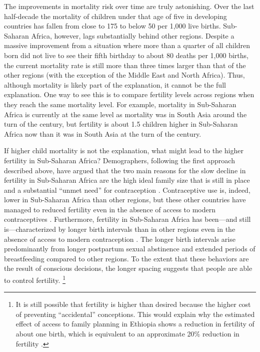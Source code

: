\documentclass[letterpaper,12pt]{article}
\begin{document}
The improvements in mortality risk over time are truly astonishing. 
Over the last half-decade the mortality of children under that age of
five in developing countries has fallen from close to 175 to below 50
per 1,000 live births. 
Sub-Saharan Africa, however, lags substantially behind other regions. 
Despite a massive improvement from a situation where more than a quarter
of all children born did not live to see their fifth birthday to about
80 deaths per 1,000 births, the current mortality rate is still more
than three times larger than that of the other regions (with the
exception of the Middle East and North Africa). 
Thus, although mortality is likely part of the explanation, it cannot 
be the full explanation. 
One way to see this is to compare fertility levels across regions when
they reach the same mortality level. 
For example, mortality in Sub-Saharan Africa is currently at the same
level as mortality was in South Asia around the turn of the century, but
fertility is about 1.5 children higher in Sub-Saharan Africa now than it
was in South Asia at the turn of the century.

If higher child mortality is not the explanation, what might lead to the
higher fertility in Sub-Saharan Africa? Demographers, following the
first approach described above, have argued that the two main reasons
for the slow decline in fertility in Sub-Saharan Africa are the high
ideal family size that is still in place and a substantial ``unmet
need'' for contraception
\citep{Bongaarts2013a,Casterline2017,Singh2017}. 
Contraceptive use is, indeed, lower in Sub-Saharan Africa than other
regions, but these other countries have managed to reduced fertility
even in the absence of access to modern contraceptives
\citet{Schultz1985,Galloway1987,Bailey1998,bengtsson06}. 
Furthermore, fertility in Sub-Saharan Africa has been---and still
is---characterized by longer birth intervals than in other regions even
in the absence of access to modern contraception
\citep{Caldwell1992,Moultrie2012,Casterline2016}. 
The longer birth intervals arise predominantly from longer postpartum
sexual abstinence and extended periods of breastfeeding compared to
other regions. 
To the extent that these behaviors are the result of conscious
decisions, the longer spacing suggests that people are able to control
fertility.%
\footnote{
It is still possible that fertility is higher than desired because the
higher cost of preventing ``accidental'' conceptions. 
This would explain why the estimated effect of access to family planning
in Ethiopia shows a reduction in fertility of about one birth, which is
equivalent to an approximate 20\% reduction in fertility
\citep{Portner2014a}.}
\end{document}
